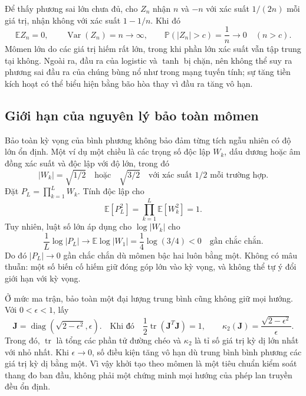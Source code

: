Để thấy phương sai lớn chưa đủ, cho $Z_n$ nhận $n$ và $-n$ với
xác suất $1/(2n)$ mỗi giá trị, nhận không với xác suất $1-1/n$.
Khi đó
\begin{equation}
 \mathbb EZ_n=0,\qquad\operatorname{Var}(Z_n)=n\to\infty,
 \qquad\mathbb P(|Z_n|>c)=\frac1n\to0\quad(n>c).
 \label{kt:eq:variance-tail-counterexample}
\end{equation}
Mômen lớn do các giá trị hiếm rất lớn, trong khi phần lớn xác suất
vẫn tập trung tại không. Ngoài ra, đầu ra của logistic và $\tanh$
bị chặn, nên không thể suy ra phương sai đầu ra của chúng bùng nổ
như trong mạng tuyến tính; sự tăng tiền kích hoạt có thể biểu hiện
bằng bão hòa thay vì đầu ra tăng vô hạn.

\subsection{Giới hạn của nguyên lý bảo toàn mômen}

Bảo toàn kỳ vọng của bình phương không bảo đảm từng tích ngẫu
nhiên có độ lớn ổn định. Một ví dụ một chiều là các trọng số độc
lập $W_k$, dấu dương hoặc âm đồng xác suất và độc lập với độ lớn,
trong đó
\[
 |W_k|=\sqrt{1/2}\quad\text{hoặc}\quad\sqrt{3/2}
 \quad\text{với xác suất }1/2\text{ mỗi trường hợp}.
\]
Đặt $P_L=\prod_{k=1}^{L}W_k$. Tính độc lập cho
\begin{equation}
 \mathbb E[P_L^2]=\prod_{k=1}^{L}\mathbb E[W_k^2]=1.
 \label{kt:eq:mean-square-product}
\end{equation}
Tuy nhiên, luật số lớn áp dụng cho $\log|W_k|$ cho
\begin{equation}
 \frac1L\log|P_L|
 \longrightarrow\mathbb E\log|W_1|
 =\frac14\log(3/4)<0
 \quad\text{gần chắc chắn}.
 \label{kt:eq:typical-product}
\end{equation}
Do đó $|P_L|\to0$ gần chắc chắn dù mômen bậc hai luôn bằng một.
Không có mâu thuẫn: một số biến cố hiếm giữ đóng góp lớn vào kỳ
vọng, và không thể tự ý đổi giới hạn với kỳ vọng.

Ở mức ma trận, bảo toàn một đại lượng trung bình cũng không giữ
mọi hướng. Với $0<\epsilon<1$, lấy
\begin{equation}
 \mathbf J=\operatorname{diag}(\sqrt{2-\epsilon^2},\epsilon).
 \quad\text{Khi đó}\quad
 \frac12\operatorname{tr}(\mathbf J^T\mathbf J)=1,
 \qquad\kappa_2(\mathbf J)=\frac{\sqrt{2-\epsilon^2}}{\epsilon}.
 \label{kt:eq:singular-counterexample}
\end{equation}
Trong đó, $\operatorname{tr}$ là tổng các phần tử đường chéo và
$\kappa_2$ là tỉ số giá trị kỳ dị lớn nhất với nhỏ nhất. Khi
$\epsilon\to0$, số điều kiện tăng vô hạn dù trung bình bình
phương các giá trị kỳ dị bằng một. Vì vậy khởi tạo theo mômen là
một tiêu chuẩn kiểm soát thang đo ban đầu, không phải một chứng
minh mọi hướng của phép lan truyền đều ổn định.

